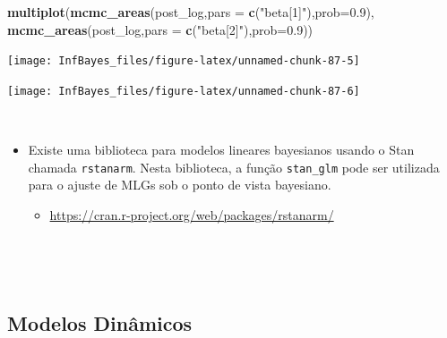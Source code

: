\documentclass[
]{book}
\newenvironment{Shaded}{\begin{snugshade}}{\end{snugshade}}
\newcommand{\CommentTok}[1]{\textcolor[rgb]{0.56,0.35,0.01}{\textit{#1}}}
\newcommand{\DataTypeTok}[1]{\textcolor[rgb]{0.13,0.29,0.53}{#1}}
\newcommand{\FloatTok}[1]{\textcolor[rgb]{0.00,0.00,0.81}{#1}}
\newcommand{\KeywordTok}[1]{\textcolor[rgb]{0.13,0.29,0.53}{\textbf{#1}}}
\newcommand{\NormalTok}[1]{#1}
\newcommand{\OperatorTok}[1]{\textcolor[rgb]{0.81,0.36,0.00}{\textbf{#1}}}
\newcommand{\StringTok}[1]{\textcolor[rgb]{0.31,0.60,0.02}{#1}}
\providecommand{\tightlist}{%
  \setlength{\itemsep}{0pt}\setlength{\parskip}{0pt}}
\begin{document}
\begin{Shaded}
\begin{Highlighting}[]
\KeywordTok{multiplot}\NormalTok{(}\KeywordTok{mcmc_areas}\NormalTok{(post_log,}\DataTypeTok{pars =} \KeywordTok{c}\NormalTok{(}\StringTok{"beta[1]"}\NormalTok{),}\DataTypeTok{prob=}\FloatTok{0.9}\NormalTok{),}
          \KeywordTok{mcmc_areas}\NormalTok{(post_log,}\DataTypeTok{pars =} \KeywordTok{c}\NormalTok{(}\StringTok{"beta[2]"}\NormalTok{),}\DataTypeTok{prob=}\FloatTok{0.9}\NormalTok{))}
\end{Highlighting}
\end{Shaded}

\begin{center}\texttt{[image: InfBayes\_files/figure-latex/unnamed-chunk-87-5]} \end{center}

\begin{Shaded}
\end{Shaded}

\begin{center}\texttt{[image: InfBayes\_files/figure-latex/unnamed-chunk-87-6]} \end{center}

\(~\)

\begin{itemize}
\item
  Existe uma biblioteca para modelos lineares bayesianos usando o Stan chamada \texttt{rstanarm}. Nesta biblioteca, a função \texttt{stan\_glm} pode ser utilizada para o ajuste de MLGs sob o ponto de vista bayesiano.

  \begin{itemize}
  \tightlist
  \item
    \url{https://cran.r-project.org/web/packages/rstanarm/}
  \end{itemize}
\end{itemize}

\(~\)

\(~\)

\hypertarget{modelos-dinuxe2micos}{%
\subsection{Modelos Dinâmicos}\label{modelos-dinuxe2micos}}
\end{document}
